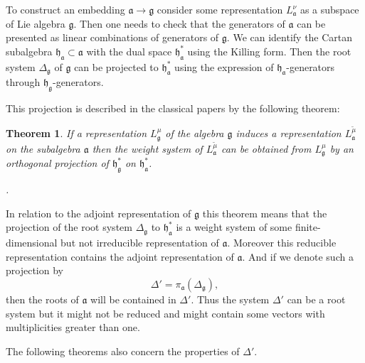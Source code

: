 \documentclass[12pt]{article}
\newtheorem{theorem}{Theorem}
\newcommand{\pia}{\pi_{\mathfrak{a}}}
\newcommand{\gf}{\mathfrak{g}}
\newcommand{\af}{\mathfrak{a}}
\newcommand{\hf}{\mathfrak{h}}
\newcommand{\hfg}{\hf_{\gf}}
\newcommand{\hfa}{\hf_{\af}}
\begin{document}
To construct an embedding $\af\to\gf$ consider some representation $L^{\nu}_{\af}$ as a subspace of
Lie algebra $\gf$. Then one needs to check that the generators of $\af$ can be presented as
linear combinations of generators of $\gf$. We can identify the Cartan subalgebra $\hfa\subset \af$ with
the dual space $\hfa^{*}$ using the Killing form. Then the root system $\Delta_{\gf}$ of $\gf$ can be
projected to $\hfa^{*}$ using the expression of $\hfa$-generators through $\hfg$-generators.


This projection is described in the classical papers \cite{dynkin1952semisimple,dynkin1952maximal} by the following theorem:

\begin{theorem}\label{dyn0}
  If a representation $L^{\mu}_{\gf}$ of the algebra $\gf$ induces a representation
  $L^{\tilde\mu}_{\af}$ on the subalgebra $\af$ then the weight system of $L^{\tilde\mu}_{\af}$ can
  be obtained from $L^{\mu}_{\gf}$ by an orthogonal projection of $\hfg^{*}$ on $\hfa^{*}$.

  \cite{dynkin1952maximal}. 
\end{theorem} 

In relation to the adjoint representation of $\gf$ this theorem means that the projection of the root system $\Delta_{\gf}$ to $\hfa^{*}$ is a weight system of some
finite-dimensional but not irreducible representation of $\af$. Moreover this reducible representation contains the adjoint representation of $\af$. And if we denote such a projection by
\begin{equation}
  \label{eq:2}
  \Delta'=\pia\left(\Delta_{\gf}\right),
\end{equation}
then the roots of $\af$ will be contained in $\Delta'$. Thus the system $\Delta'$ can be a root
system but it might not be reduced and might contain some vectors with multiplicities greater than
one.

The following theorems \cite{dynkin1952semisimple} also concern the properties of $\Delta'$. 
\end{document}
